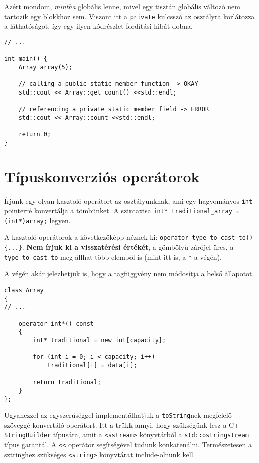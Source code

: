 \documentclass[a4paper, 11pt, oneside]{book}
\begin{document}
Azért mondom, \textit{mintha} globális lenne, mivel egy tisztán globális változó nem tartozik egy blokkhoz sem. Viszont itt a \verb*|private| kulcsszó az osztályra korlátozza a láthatóságot, így egy ilyen kódrészlet fordítási hibát dobna.

\begin{lstlisting}[style=cppstyle]
// ...

int main() {
	Array array(5);
	
	// calling a public static member function -> OKAY
	std::cout << Array::get_count() <<std::endl;
	
	// referencing a private static member field -> ERROR
	std::cout << Array::count <<std::endl;
	
	return 0;
}
\end{lstlisting}

\section{Típuskonverziós operátorok}

Írjunk egy olyan kasztoló operátort az osztályunknak, ami egy hagyományos \verb*|int| pointerré konvertálja a tömbünket. A szintaxisa \verb|int* traditional_array = (int*)array;| legyen.

A kasztoló operátorok a következőképp néznek ki: \verb|operator type_to_cast_to() {...}|. \textbf{Nem írjuk ki a visszatérési értékét}, a gömbölyű zárójel üres, a \verb*|type_to_cast_to| meg állhat több elemből is (mint itt is, a \verb*|*| a végén).

A végén akár jelezhetjük is, hogy a tagfüggvény nem módosítja a belső állapotot.

\begin{lstlisting}[style=cppstyle]
class Array 
{
// ...

	operator int*() const 
	{
		int* traditional = new int[capacity];
		
		for (int i = 0; i < capacity; i++)
			traditional[i] = data[i];
		
		return traditional;
	}
};
\end{lstlisting}

Ugyanezzel az egyszerűséggel implementálhatjuk a \verb*|toString|nek megfelelő szöveggé konvertáló operátort. Itt a trükk annyi, hogy szükségünk lesz a C++ \verb*|StringBuilder| típusára, amit a \verb*|<sstream>| könyvtárból a \verb*|std::ostringstream| típus garantál. A \verb*|<<| operátor segítségével tudunk konkatenálni. Természetesen a sztringhez szükséges \verb*|<string>| könyvtárat include-olnunk kell.
\end{document}
